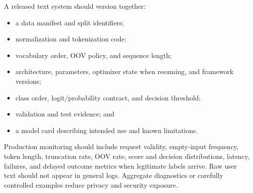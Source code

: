 A released text system should version together:
\begin{itemize}
  \item a data manifest and split identifiers;
  \item normalization and tokenization code;
  \item vocabulary order, OOV policy, and sequence length;
  \item architecture, parameters, optimizer state when resuming, and framework
  versions;
  \item class order, logit/probability contract, and decision threshold;
  \item validation and test evidence; and
  \item a model card describing intended use and known limitations.
\end{itemize}

Production monitoring should include request validity, empty-input frequency,
token length, truncation rate, OOV rate, score and decision distributions,
latency, failures, and delayed outcome metrics when legitimate labels arrive.
Raw user text should not appear in general logs. Aggregate diagnostics or
carefully controlled examples reduce privacy and security exposure.

